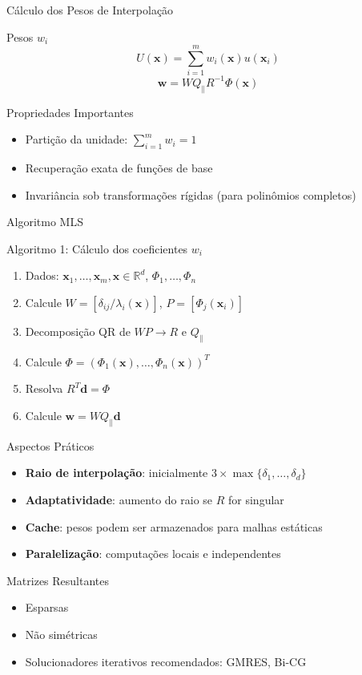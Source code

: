 \documentclass[../main/main.tex]{subfiles}
\begin{document}
\begin{frame}{Cálculo dos Pesos de Interpolação}
\begin{block}{Pesos $w_i$}
\[
U(\mathbf{x}) = \sum_{i=1}^m w_i(\mathbf{x}) u(\mathbf{x}_i)
\]
\[
\mathbf{w} = W Q_\parallel R^{-1} \Phi(\mathbf{x})
\]
\end{block}

\begin{block}{Propriedades Importantes}
\begin{itemize}
\item Partição da unidade: $\sum_{i=1}^m w_i = 1$
\item Recuperação exata de funções de base
\item Invariância sob transformações rígidas (para polinômios completos)
\end{itemize}
\end{block}
\end{frame}

\begin{frame}{Algoritmo MLS}
\begin{block}{Algoritmo 1: Cálculo dos coeficientes $w_i$}
\begin{enumerate}
\item Dados: $\mathbf{x}_1, \ldots, \mathbf{x}_m, \mathbf{x} \in \mathbb{R}^d$, $\Phi_1, \ldots, \Phi_n$
\item Calcule $W = [\delta_{ij}/\lambda_i(\mathbf{x})]$, $P = [\Phi_j(\mathbf{x}_i)]$
\item Decomposição QR de $WP \rightarrow R$ e $Q_\parallel$
\item Calcule $\Phi = (\Phi_1(\mathbf{x}), \ldots, \Phi_n(\mathbf{x}))^T$
\item Resolva $R^T \mathbf{d} = \Phi$
\item Calcule $\mathbf{w} = W Q_\parallel \mathbf{d}$
\end{enumerate}
\end{block}
\end{frame}

\begin{frame}{Aspectos Práticos}
\begin{itemize}
\item \textbf{Raio de interpolação}: inicialmente $3 \times \max\{\delta_1, \ldots, \delta_d\}$
\item \textbf{Adaptatividade}: aumento do raio se $R$ for singular
\item \textbf{Cache}: pesos podem ser armazenados para malhas estáticas
\item \textbf{Paralelização}: computações locais e independentes
\end{itemize}

\begin{block}{Matrizes Resultantes}
\begin{itemize}
\item Esparsas
\item Não simétricas
\item Solucionadores iterativos recomendados: GMRES, Bi-CG
\end{itemize}
\end{block}
\end{frame}
\end{document}
